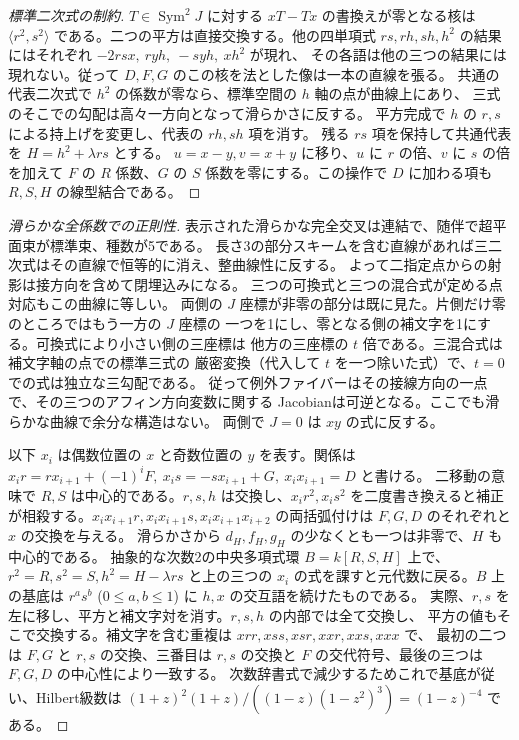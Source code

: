 \begin{proof}[標準二次式の制約]
$T\in\operatorname{Sym}^2J$ に対する $xT-Tx$ の書換えが零となる核は
$\langle r^2,s^2\rangle$ である。二つの平方は直接交換する。他の四単項式
$rs,rh,sh,h^2$ の結果にはそれぞれ $-2rsx,\ ryh,\ -syh,\ xh^2$ が現れ、
その各語は他の三つの結果には現れない。従って $D,F,G$ のこの核を法とした像は一本の直線を張る。
共通の代表二次式で $h^2$ の係数が零なら、標準空間の $h$ 軸の点が曲線上にあり、
三式のそこでの勾配は高々一方向となって滑らかさに反する。
平方完成で $h$ の $r,s$ による持上げを変更し、代表の $rh,sh$ 項を消す。
残る $rs$ 項を保持して共通代表を $H=h^2+\lambda rs$ とする。
$u=x-y, v=x+y$ に移り、$u$ に $r$ の倍、$v$ に $s$ の倍を加えて
$F$ の $R$ 係数、$G$ の $S$ 係数を零にする。この操作で $D$ に加わる項も $R,S,H$ の線型結合である。
\end{proof}

\begin{proof}[滑らかな全係数での正則性]
表示された滑らかな完全交叉は連結で、随伴で超平面束が標準束、種数が5である。
長さ3の部分スキームを含む直線があれば三二次式はその直線で恒等的に消え、整曲線性に反する。
よって二指定点からの射影は接方向を含めて閉埋込みになる。
三つの可換式と三つの混合式が定める点対応もこの曲線に等しい。
両側の $J$ 座標が非零の部分は既に見た。片側だけ零のところではもう一方の $J$ 座標の
一つを1にし、零となる側の補文字を1にする。可換式により小さい側の三座標は
他方の三座標の $t$ 倍である。三混合式は補文字軸の点での標準三式の
厳密変換（代入して $t$ を一つ除いた式）で、$t=0$ での式は独立な三勾配である。
従って例外ファイバーはその接線方向の一点で、その三つのアフィン方向変数に関する
Jacobianは可逆となる。ここでも滑らかな曲線で余分な構造はない。
両側で $J=0$ は $xy$ の式に反する。

以下 $x_i$ は偶数位置の $x$ と奇数位置の $y$ を表す。関係は
$x_i r=r x_{i+1}+(-1)^i F,\ x_i s=-s x_{i+1}+G,\ x_i x_{i+1}=D$ と書ける。
二移動の意味で $R,S$ は中心的である。$r,s,h$ は交換し、$x_i r^2, x_i s^2$
を二度書き換えると補正が相殺する。$x_i x_{i+1}r, x_i x_{i+1}s, x_i x_{i+1} x_{i+2}$
の両括弧付けは $F,G,D$ のそれぞれと $x$ の交換を与える。
滑らかさから $d_H,f_H,g_H$ の少なくとも一つは非零で、$H$ も中心的である。
抽象的な次数2の中央多項式環 $B=k[R,S,H]$ 上で、$r^2=R,s^2=S,h^2=H-\lambda rs$
と上の三つの $x_i$ の式を課すと元代数に戻る。$B$ 上の基底は
$r^a s^b$ ($0\le a,b\le1$) に $h,x$ の交互語を続けたものである。
実際、$r,s$ を左に移し、平方と補文字対を消す。$r,s,h$ の内部では全て交換し、
平方の値もそこで交換する。補文字を含む重複は $xrr,xss,xsr,xxr,xxs,xxx$ で、
最初の二つは $F,G$ と $r,s$ の交換、三番目は $r,s$ の交換と
$F$ の交代符号、最後の三つは $F,G,D$ の中心性により一致する。
次数辞書式で減少するためこれで基底が従い、Hilbert級数は
$(1+z)^2(1+z)/((1-z)(1-z^2)^3)=(1-z)^{-4}$ である。


\end{proof}
